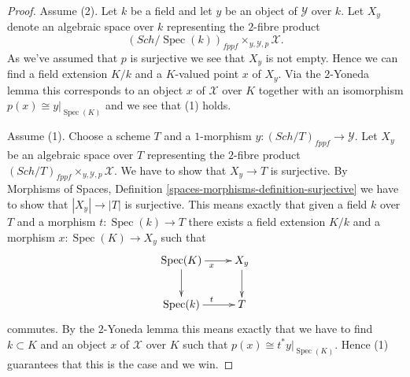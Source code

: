 \documentclass{stacks-project}
\theoremstyle{plain}
\theoremstyle{definition}
\theoremstyle{remark}
\numberwithin{equation}{subsection}
\def\Spec{\mathop{\mathrm{Spec}}}
\def\Sch{\mathit{Sch}}
\begin{document}
\begin{proof}
Assume (2). Let $k$ be a field and let $y$ be an object of
$\mathcal{Y}$ over $k$. Let $X_y$ denote an algebraic space over $k$
representing the $2$-fibre product
$$
(\Sch/\Spec(k))_{fppf} \times_{y, \mathcal{Y}, p} \mathcal{X}.
$$
As we've assumed that $p$ is surjective we see that $X_y$ is not empty.
Hence we can find a field extension $K/k$ and a $K$-valued point
$x$ of $X_y$. Via the $2$-Yoneda lemma this corresponds to an object
$x$ of $\mathcal{X}$ over $K$ together with an isomorphism
$p(x) \cong y|_{\Spec(K)}$ and we see that (1) holds.

\medskip\noindent
Assume (1). Choose a scheme $T$ and a $1$-morphism
$y : (\Sch/T)_{fppf} \to \mathcal{Y}$. Let
$X_y$ be an algebraic space over $T$ representing the $2$-fibre product
$(\Sch/T)_{fppf} \times_{y, \mathcal{Y}, p} \mathcal{X}$.
We have to show that $X_y \to T$ is surjective. By
Morphisms of Spaces, Definition \ref{spaces-morphisms-definition-surjective}
we have to show that $|X_y| \to |T|$ is surjective.
This means exactly that given a field $k$ over $T$ and a
morphism $t : \Spec(k) \to T$ there exists a field extension
$K/k$ and a morphism $x : \Spec(K) \to X_y$ such that
$$
\xymatrix{
\Spec(K) \ar[d] \ar[r]_x & X_y \ar[d] \\
\Spec(k) \ar[r]^t & T
}
$$
commutes. By the $2$-Yoneda lemma this means exactly that we have to find
$k \subset K$ and an object $x$ of $\mathcal{X}$ over $K$ such that
$p(x) \cong t^*y|_{\Spec(K)}$. Hence (1) guarantees that this is
the case and we win.
\end{proof}
\end{document}
